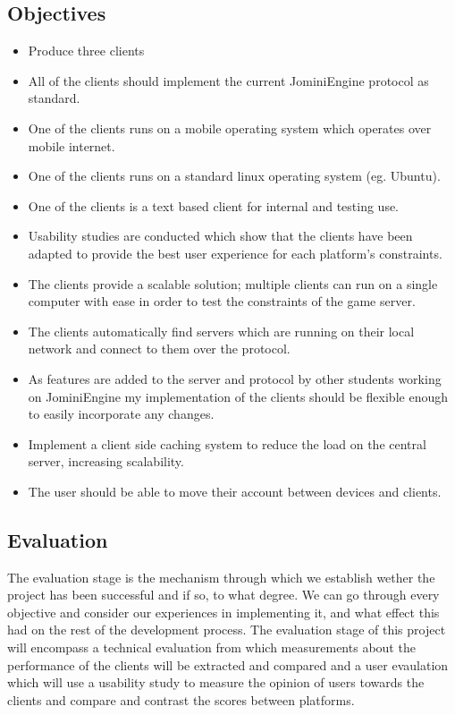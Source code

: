 \documentclass{article}
\begin{document}
	\subsection{Objectives}
	\begin{itemize}
	\item Produce three clients
	\item All of the clients should implement the current JominiEngine protocol as standard.
	\item One of the clients runs on a mobile operating system which operates over mobile internet.
	\item One of the clients runs on a standard linux operating system (eg. Ubuntu).
	\item One of the clients is a text based client for internal and testing use.
	\item Usability studies are conducted which show that the clients have been adapted to provide the best user experience for each platform’s constraints.
	\item The clients provide a scalable solution; multiple clients can run on a single computer with ease in order to test the constraints of the game server.
	\item The clients automatically find servers which are running on their local network and connect to them over the protocol. 
	\item As features are added to the server and protocol by other students working on JominiEngine my implementation of the clients should be flexible enough to easily incorporate any changes.
	\item Implement a client side caching system to reduce the load on the central server, increasing scalability.
	\item The user should be able to move their account between devices and clients.
\end{itemize}
	\subsection{Evaluation}
	The evaluation stage is the mechanism through which we establish wether the project has been successful and if so, to what degree. We can go through every objective and consider our experiences in implementing it, and what effect this had on the rest of the development process. The evaluation stage of this project will encompass a technical evaluation from which measurements about the performance of the clients will be extracted and compared and a user evaulation which will use a usability study to measure the opinion of users towards the clients and compare and contrast the scores between platforms.
\end{document}
